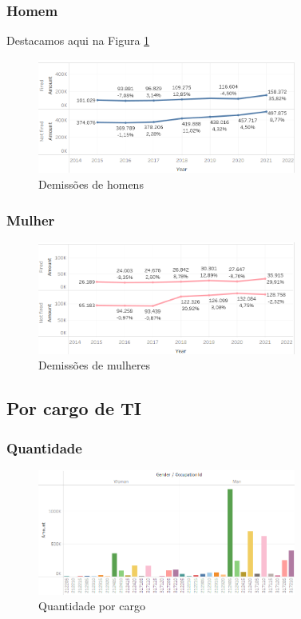\subsubsection{Homem}

Destacamos aqui na Figura \ref{fig_4_qnt_h_demit}

\begin{figure}[htbp]
	\centerline{
		\includegraphics[width=85mm]{assets/4_qnt_h_demit.PNG}
	}
	\caption{Demissões de homens}
	\label{fig_4_qnt_h_demit}
\end{figure}

\subsubsection{Mulher}

\begin{figure}[htbp]
	\centerline{
		\includegraphics[width=85mm]{assets/4_qnt_m_demit.PNG}
	}
	\caption{Demissões de mulheres}
	\label{fig_4_qnt_m_demit}
\end{figure}


\subsection{Por cargo de TI}

\subsubsection{Quantidade}

\begin{figure}[htbp]
	\centerline{
		\includegraphics[width=85mm]{assets/5_qnt_cbo.PNG}
	}
	\caption{Quantidade por cargo}
	\label{fig_5_qnt_cbo}
\end{figure}

